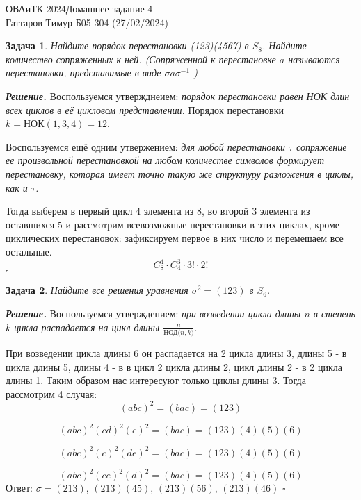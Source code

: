\documentclass[12pt]{article}
\newtheorem{problem}{Задача}
\newenvironment{solution}[1][\it{Решение}]{\textbf{#1. } }{$\square$}
\begin{document}
\noindent ОВАиТК 2024\hfill Домашнее задание 4 \\
Гаттаров Тимур Б05-304 (27/02/2024)

\hrulefill


\begin{problem}
Найдите порядок перестановки (123)(4567) в $S_8$. Найдите количество сопряженных к ней. (Сопряженной к перестановке $a$ называются перестановки, представимые в виде $\sigma a \sigma^{-1}$ )
\end{problem}

\begin{solution}
Воспользуемся утвержднеием: \textit{порядок перестановки равен НОК длин всех циклов в её цикловом представлении.} Порядок перестановки $k = \text{НОК}(1, 3, 4) = 12$.

Воспользуемся ещё одним утвержением: \textit{для любой перестановки $\tau$ сопряжение ее произвольной перестановкой на любом количестве символов формирует перестановку, которая имеет точно такую же структуру разложения в циклы, как и $\tau$.} 

Тогда выберем в первый цикл 4 элемента из 8, во второй 3 элемента из оставшихся 5 и рассмотрим всевозможные перестановки в этих циклах, кроме циклических перестановок: зафиксируем первое в них число и перемешаем все остальные.
$$
C_8^4\cdot C_4^3 \cdot 3! \cdot 2!
$$
\end{solution}
\begin{problem}
Найдите все решения уравнения $\sigma^2=(123)$ в $S_6$.
\end{problem}

\begin{solution}
    Воспользуемся утверждением: \textit{при возведении цикла длины $n$ в степень $k$ цикла распадается на цикл длины $\frac{n}{\text{НОД($n, k$)}}$}.

    При возведении цикла длины 6 он распадается на 2 цикла длины 3, длины 5 - в цикла длины 5, длины 4 - в в цикл 2 цикла длины 2, цикл длины 2 - в 2 цикла длины 1. Таким образом нас интересуют только циклы длины 3. Тогда рассмотрим 4 случая:
    $$
    (abc)^2 = (bac) = (123)
    $$
    
    $$
    (abc)^2(cd)^2(e)^2 = (bac) = (123)(4)(5)(6)
    $$

    $$
    (abc)^2(c)^2(de)^2 = (bac) = (123)(4)(5)(6)
    $$

    $$
    (abc)^2(ce)^2(d)^2= (bac) = (123)(4)(5)(6)
    $$
    Ответ: $\sigma = (213)$, $(213)(45)$, $(213)(56)$, $(213)(46)$
\end{solution}
\end{document}
